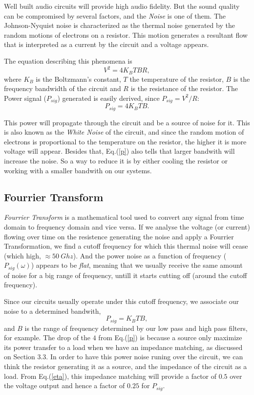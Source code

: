 \documentclass{article}
\begin{document}
{Well built audio circuits will provide high audio fidelity. But the
sound quality can be compromised by several factors, and the
\emph{Noise} is one of them. The Johnson-Nyquist noise is characterized as the 
thermal noise generated by the random motions of electrons on a resistor. This motion
generates a resultant flow that is interpreted as a current by the
circuit and a voltage appears. 

The equation describing this phenomena is 
\begin{equation}
V^{2}=4K_{B}TBR,
\label{v}
\end{equation}
where $K_{B}$ is the Boltzmann’s constant, $T$ the temperature of the
resistor, $B$ is the frequency bandwidth of the circuit
and $R$ is the resistance of the resistor. The Power signal ($P_{sig}$)
generated is easily derived, since $P_{sig}=V^{2}/R$:
\begin{equation}
P_{sig}=4K_{B}TB.
\label{p}
\end{equation}

This power will propagate through the circuit and be a source of noise
for it. This is also known as the \emph{White Noise} of the circuit, and
since the random motion of electrons is proportional to the temperature on the resistor,
the higher it is more voltage will appear. Besides that,
Eq.(\ref{p}) also tells that larger bandwith will increase the noise. So
a way to reduce it is by either cooling the resistor or working with a
smaller bandwith on our systems.

\subsection{Fourrier Transform}

\emph{Fourrier Transform} is a mathematical tool used to convert any
signal from time domain to frequency domain and vice versa.
If we analyse the voltage (or current) flowing over time on the resistence generating the
noise and apply a Fourrier Transformation, we find a cutoff frequency
for which this thermal noise will cease (which high,
$\approx50 \ Ghz$). And the power noise as a
function of frequency ($P_{sig}(\omega)$) appears to be \emph{flat}, meaning that
we usually receive the same amount of noise for a big range of
frequency, untill it starts cutting off (around the cutoff frequency).

Since our circuits usually operate under this cutoff frequency, we
associate our noise to a determined bandwith,
\begin{equation}
P_{sig}=K_{B}TB,
\label{last}
\end{equation}
and $B$ is the range of frequency determined by our low pass and high
pass filters, for example. The drop of the $4$ from Eq.(\ref{p}) is
because a source only maximize its power transfer to a load when we have an impedance
matching, as discussed on Section 3.3. In order to have this power noise
runing over the circuit, we can think the resistor generating it as a
source, and the impedance of the circuit as a load. From Eq.(\ref{eta}),
this impedance matching will provide a factor of $0.5$ over the voltage
output and hence a factor of $0.25$ for $P_{sig}$.

}
\end{document}
